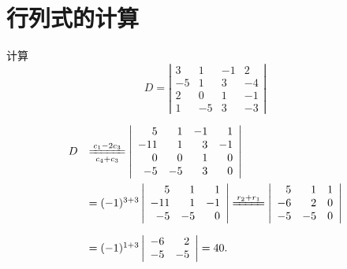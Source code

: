 \section{行列式的计算}
\begin{li}
  计算
  $$
  D = \left|
    \begin{array}{rrrr}
      3   &  1  &  -1  &  2 \\
      -5  &  1  &   3  & -4 \\
      2   &  0  &   1  & -1 \\
      1   & -5  &   3  &  -3 
    \end{array}
  \right|
  $$
\end{li}
\begin{jie}
  $$
  \begin{array}{ll}
    D&  \xlongequal[c_4+c_3]{c_1-2c_3}  \left|
       \begin{array}{rrrr}
         5  & 1 & -1 & 1  \\
         -11 & 1 &  3 & -1 \\
         0 & 0 &  1 & 0 \\
         -5 & -5 & 3 & 0 
       \end{array}
                       \right|\\[0.8cm]
     & = (-1)^{3+3} \left| 
       \begin{array}{rrr}
         5 & 1 & 1\\
         -11 & 1 & -1 \\
         -5 & -5 & 0
       \end{array}
                   \right| 
                   \xlongequal{r_2+r_1}
                   \left|
                   \begin{array}{rrr}
                     5 & 1 & 1\\
                     -6 & 2 & 0 \\
                     -5 & -5 & 0
                   \end{array}
                               \right|\\[0.8cm]
     &  = (-1)^{1+3} \left|
       \begin{array}{rr}
         -6 &  2\\
         -5 & -5
       \end{array}
              \right| = 40.
  \end{array}
  $$    
\end{jie}

